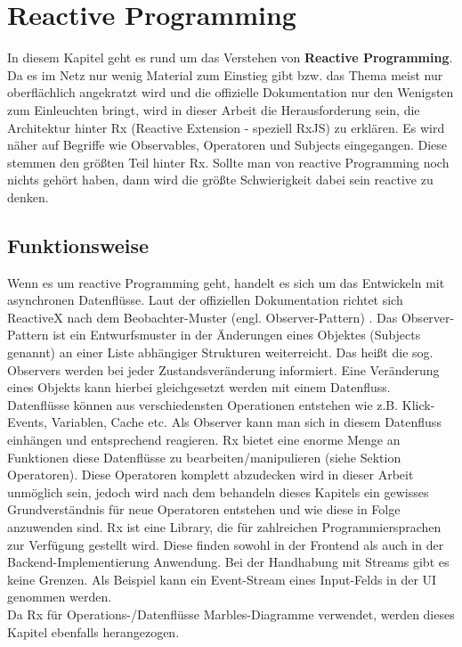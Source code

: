 \section{Reactive Programming}
In diesem Kapitel geht es rund um das Verstehen von \textbf{Reactive Programming}. Da es im Netz nur wenig Material zum Einstieg gibt bzw. das Thema meist nur oberflächlich angekratzt wird und die offizielle Dokumentation nur den Wenigsten zum Einleuchten bringt, wird in dieser Arbeit die Herausforderung sein, die Architektur hinter Rx (Reactive Extension - speziell RxJS) zu erklären. Es wird näher auf Begriffe wie Observables, Operatoren und Subjects eingegangen. Diese stemmen den größten Teil hinter Rx. Sollte man von reactive Programming noch nichts gehört haben, dann wird die größte Schwierigkeit dabei sein \glqq{}reactive\grqq{} zu denken.

\subsection{Funktionsweise}
Wenn es um reactive Programming geht, handelt es sich um das Entwickeln mit asynchronen Datenflüsse. Laut der offiziellen Dokumentation richtet sich ReactiveX nach dem Beobachter-Muster (engl. Observer-Pattern) \cite{rx-intro}. Das Observer-Pattern ist ein Entwurfsmuster in der Änderungen eines  Objektes (Subjects genannt) an einer Liste abhängiger Strukturen weiterreicht. Das heißt die sog. Observers werden bei jeder Zustandsveränderung informiert. Eine Veränderung eines Objekts kann hierbei gleichgesetzt werden mit einem Datenfluss. Datenflüsse können aus verschiedensten Operationen entstehen wie z.B. Klick-Events, Variablen, Cache etc. Als Observer kann man sich in diesem Datenfluss einhängen und entsprechend reagieren. Rx bietet eine enorme Menge an Funktionen diese Datenflüsse zu bearbeiten/manipulieren (siehe Sektion Operatoren). Diese Operatoren komplett abzudecken wird in dieser Arbeit unmöglich sein, jedoch wird nach dem behandeln dieses Kapitels ein gewisses Grundverständnis für neue Operatoren entstehen und wie diese in Folge anzuwenden sind. Rx ist eine Library, die für zahlreichen Programmiersprachen zur Verfügung gestellt wird. Diese finden sowohl in der Frontend als auch in der Backend-Implementierung Anwendung. Bei der Handhabung mit Streams gibt es keine Grenzen. Als Beispiel kann ein Event-Stream eines Input-Felds in der UI genommen werden.\\

\noindent
Da Rx für Operations-/Datenflüsse Marbles-Diagramme verwendet, werden dieses Kapitel ebenfalls herangezogen.

